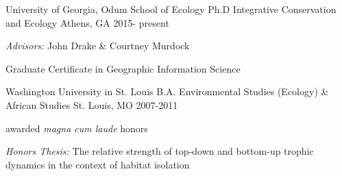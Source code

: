 

\begin{cventries}

  \cventry
  	{University of Georgia, Odum School of Ecology} %
    {Ph.D Integrative Conservation and Ecology} %
    {Athens, GA} %
    {2015- present} %
	{
      \begin{cvitems} %
      \item{\textit{Advisors:} John Drake \& Courtney Murdock}
      \item{Graduate Certificate in Geographic Information Science}
      \end{cvitems}
    }

   \cventry
    {Washington University in St. Louis} %
    {B.A. Environmental Studies (Ecology) \& African Studies} %
    {St. Louis, MO} %
    {2007-2011} %
    {
      \begin{cvitems} %
      	\item {awarded \textit{magna cum laude} honors}
        \item { \textit{Honors Thesis:} The relative strength of top-down and bottom-up trophic dynamics in the context of habitat isolation}
      \end{cvitems}
    }

\end{cventries}
